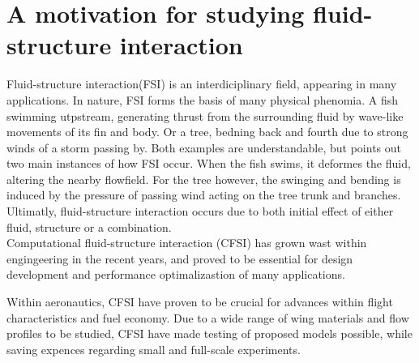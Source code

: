 \chapter{A motivation for studying fluid-structure interaction}
Fluid-structure interaction(FSI) is an interdiciplinary field, appearing in many applications. In nature, FSI forms the basis of many physical phenomia. A fish swimming utpstream,
generating thrust from the surrounding fluid by wave-like movements of its fin and body. Or a tree, bedning back and fourth due to strong winds of a storm passing by. Both examples are understandable, but points out two main instances of how FSI occur. When the fish swims, it deformes the fluid, altering the nearby flowfield. For the tree however, the swinging and bending is induced by the pressure of passing wind acting on the tree trunk and branches. Ultimatly, fluid-structure interaction occurs due to both initial effect of either fluid, structure or a combination.  \\

\newpage
Computational fluid-structure interaction (CFSI) has grown wast within engingeering in the recent years, and proved to be essential for design development and performance optimalizastion of many applications. 

Within aeronautics, CFSI have proven to be crucial for advances within flight characteristics and fuel economy. Due to a wide range of  wing materials and flow profiles to be studied, CFSI have made testing of proposed models possible, while saving expences regarding small and full-scale experiments. \newline

